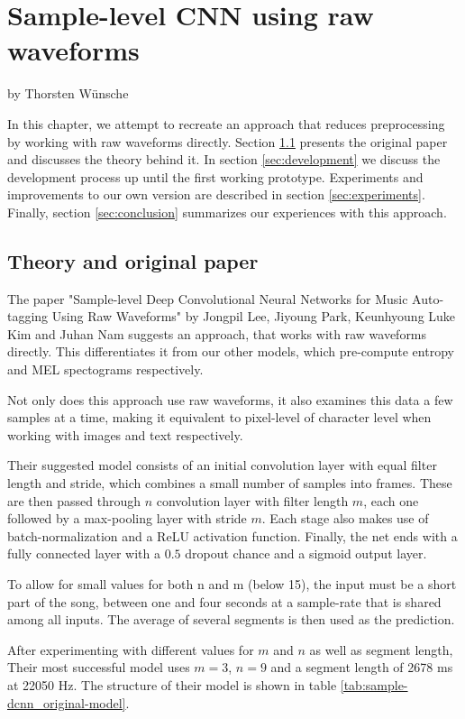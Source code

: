 \chapter{Sample-level CNN using raw waveforms}
by Thorsten Wünsche

\bigskip

In this chapter, we attempt to recreate an approach that reduces preprocessing by working with raw waveforms directly. Section \ref{sec:theory} presents the original paper and discusses the theory behind it. In section \ref{sec:development} we discuss the development process up until the first working prototype. Experiments and improvements to our own version are described in section \ref{sec:experiments}. Finally, section \ref{sec:conclusion} summarizes our experiences with this approach.

\section{Theory and original paper}
\label{sec:theory}
The paper "Sample-level Deep Convolutional Neural Networks for Music Auto-tagging Using Raw Waveforms" \cite{DBLP:journals/corr/LeePKN17} by Jongpil Lee, Jiyoung Park, Keunhyoung Luke Kim and Juhan Nam suggests an approach, that works with raw waveforms directly. This differentiates it from our other models, which pre-compute entropy and MEL spectograms respectively.

Not only does this approach use raw waveforms, it also examines this data a few samples at a time, making it equivalent to pixel-level of character level when working with images and text respectively. 

Their suggested model consists of an initial convolution layer with equal filter length and stride, which combines a small number of samples into frames. These are then passed through $n$ convolution layer with filter length $m$, each one followed by a max-pooling layer with stride $m$. Each stage also makes use of batch-normalization and a ReLU activation function. Finally, the net ends with a fully connected layer with a $0.5$ dropout chance and a sigmoid output layer.

To allow for small values for both n and m (below 15), the input must be a short part of the song, between one and four seconds at a sample-rate that is shared among all inputs. The average of several segments is then used as the prediction.

After experimenting with different values for $m$ and $n$ as well as segment length, Their most successful model uses $m=3$, $n=9$ and a segment length of 2678 ms at 22050 Hz. The structure of their model is shown in table \ref{tab:sample-dcnn_original-model}.

